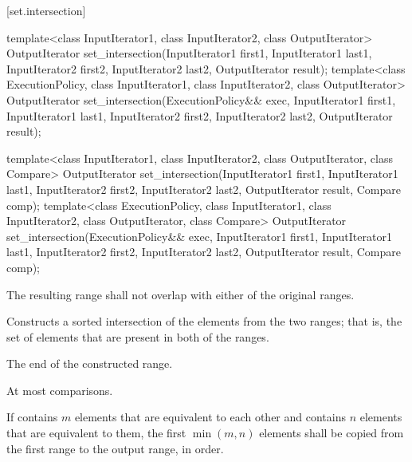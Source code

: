 [set.intersection]{}

%
\begin{itemdecl}
template<class InputIterator1, class InputIterator2,
         class OutputIterator>
  OutputIterator
    set_intersection(InputIterator1 first1, InputIterator1 last1,
                     InputIterator2 first2, InputIterator2 last2,
                     OutputIterator result);
template<class ExecutionPolicy, class InputIterator1, class InputIterator2,
         class OutputIterator>
  OutputIterator
    set_intersection(ExecutionPolicy&& exec,
                     InputIterator1 first1, InputIterator1 last1,
                     InputIterator2 first2, InputIterator2 last2,
                     OutputIterator result);

template<class InputIterator1, class InputIterator2,
         class OutputIterator, class Compare>
  OutputIterator
    set_intersection(InputIterator1 first1, InputIterator1 last1,
                     InputIterator2 first2, InputIterator2 last2,
                     OutputIterator result, Compare comp);
template<class ExecutionPolicy, class InputIterator1, class InputIterator2,
         class OutputIterator, class Compare>
  OutputIterator
    set_intersection(ExecutionPolicy&& exec,
                     InputIterator1 first1, InputIterator1 last1,
                     InputIterator2 first2, InputIterator2 last2,
                     OutputIterator result, Compare comp);
\end{itemdecl}

\begin{itemdescr}
\pnum
\requires
The resulting range shall not overlap with either of the original ranges.

\pnum
\effects
Constructs a sorted intersection of the elements from the two ranges;
that is, the set of elements that are present in both of the ranges.

\pnum
\returns
The end of the constructed range.

\pnum
\complexity
At most
comparisons.

\pnum
\remarks If  contains $m$ elements that are equivalent to
each other and  contains $n$ elements that are equivalent
to them, the first $\min(m, n)$ elements shall be copied from the first range
to the output range, in order.
\end{itemdescr}

